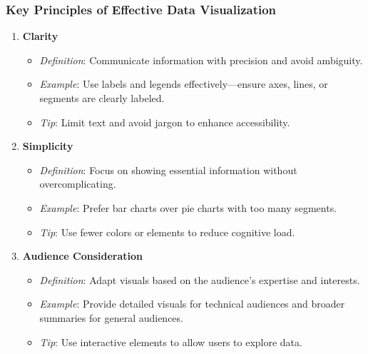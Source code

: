 \documentclass[aspectratio=169]{beamer}
\begin{document}
\begin{frame}[fragile]
    \frametitle{Key Principles of Effective Data Visualization}
    \begin{enumerate}
        \item \textbf{Clarity}
        \begin{itemize}
            \item \textit{Definition}: Communicate information with precision and avoid ambiguity.
            \item \textit{Example}: Use labels and legends effectively—ensure axes, lines, or segments are clearly labeled.
            \item \textit{Tip}: Limit text and avoid jargon to enhance accessibility.
        \end{itemize}
        
        \item \textbf{Simplicity}
        \begin{itemize}
            \item \textit{Definition}: Focus on showing essential information without overcomplicating.
            \item \textit{Example}: Prefer bar charts over pie charts with too many segments.
            \item \textit{Tip}: Use fewer colors or elements to reduce cognitive load.
        \end{itemize}
        
        \item \textbf{Audience Consideration}
        \begin{itemize}
            \item \textit{Definition}: Adapt visuals based on the audience's expertise and interests.
            \item \textit{Example}: Provide detailed visuals for technical audiences and broader summaries for general audiences.
            \item \textit{Tip}: Use interactive elements to allow users to explore data.
        \end{itemize}
    \end{enumerate}
\end{frame}
\end{document}
